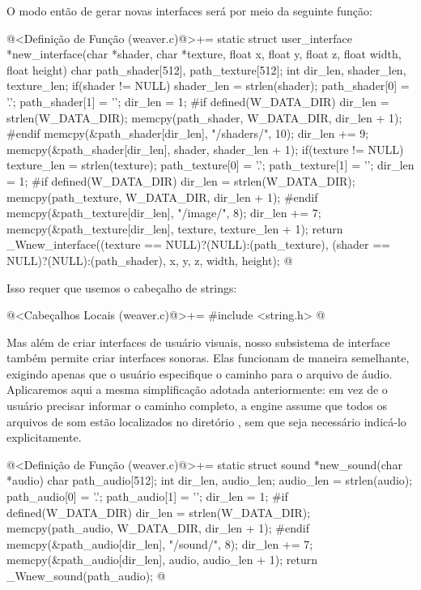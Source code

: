 O modo então de gerar novas interfaces será por meio da seguinte
função:

\iniciocodigo
@<Definição de Função (weaver.c)@>+=
static struct user_interface *new_interface(char *shader, char *texture,
                                            float x, float y, float z,
                                            float width, float height){
  char path_shader[512], path_texture[512];
  int dir_len, shader_len, texture_len;
  if(shader != NULL){
    shader_len = strlen(shader);
    path_shader[0] = '.';
    path_shader[1] = '\0';
    dir_len = 1;
#if defined(W_DATA_DIR)
    dir_len = strlen(W_DATA_DIR);
    memcpy(path_shader, W_DATA_DIR, dir_len + 1);
#endif
    memcpy(&path_shader[dir_len], "/shaders/", 10);
    dir_len += 9;
    memcpy(&path_shader[dir_len], shader, shader_len + 1);
  }
  if(texture != NULL){
    texture_len = strlen(texture);
    path_texture[0] = '.';
    path_texture[1] = '\0';
    dir_len = 1;
#if defined(W_DATA_DIR)
    dir_len = strlen(W_DATA_DIR);
    memcpy(path_texture, W_DATA_DIR, dir_len + 1);
#endif
    memcpy(&path_texture[dir_len], "/image/", 8);
    dir_len += 7;
    memcpy(&path_texture[dir_len], texture, texture_len + 1);
  }  
  return _Wnew_interface((texture == NULL)?(NULL):(path_texture),
                         (shader == NULL)?(NULL):(path_shader),
                         x, y, z, width, height);
}
@
\fimcodigo

Isso requer que usemos o cabeçalho de strings:

\iniciocodigo
@<Cabeçalhos Locais (weaver.c)@>+=
#include <string.h>
@
\fimcodigo

Mas além de criar interfaces de usuário visuais, nosso subsistema de
interface também permite criar interfaces sonoras. Elas funcionam de
maneira semelhante, exigindo apenas que o usuário especifique o
caminho para o arquivo de áudio. Aplicaremos aqui a mesma
simplificação adotada anteriormente: em vez de o usuário precisar
informar o caminho completo, a engine assume que todos os arquivos de
som estão localizados no diretório , sem que seja
necessário indicá-lo explicitamente.

\iniciocodigo
@<Definição de Função (weaver.c)@>+=
static struct sound *new_sound(char *audio){
  char path_audio[512];
  int dir_len, audio_len;
  audio_len = strlen(audio);
  path_audio[0] = '.';
  path_audio[1] = '\0';
  dir_len = 1;
#if defined(W_DATA_DIR)
  dir_len = strlen(W_DATA_DIR);
  memcpy(path_audio, W_DATA_DIR, dir_len + 1);
#endif
  memcpy(&path_audio[dir_len], "/sound/", 8);
  dir_len += 7;
  memcpy(&path_audio[dir_len], audio, audio_len + 1);  
  return _Wnew_sound(path_audio);
}
@
\fimcodigo

